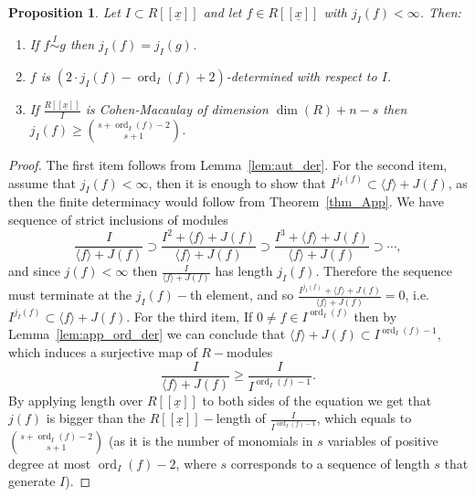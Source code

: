 \documentclass{article}
\newtheorem{proposition}[theorem]{Proposition}
\newtheorem{remark}[theorem]{Remark}
\DeclareMathOperator{\ord}{ord}
\newcommand{\equivd}{\overset{I}{\sim}}
\numberwithin{theorem}{section}
\begin{document}

\begin{proposition}\label{prop:jacobian_prop}
    Let $I \subset R[[\underline{x}]]$ and let $f \in R[[\underline{x}]]$ with $j_I(f)<\infty$. Then:
    \begin{enumerate}
        \item If $f \equivd g$ then $j_I(f)=j_I(g)$.
        \item $f$ is $(2 \cdot j_I(f) -\ord_I(f)+2)$-determined with respect to $I$. 
        \item If $\frac{R[[\underline{x}]]}{I}$ is Cohen-Macaulay of dimension $\dim(R) + n- s$ then  $j_I(f) \geq \binom{s+\ord_I(f)-2}{s+1}$.
    \end{enumerate}
\end{proposition}

\begin{proof}
    The first item follows from Lemma~\ref{lem:aut_der}. For the second item, assume that $j_I(f) < \infty$, then it is enough to show that $I^{j_I(f)} \subset \langle f \rangle + J(f)$, as then the finite determinacy would follow from Theorem~\ref{thm_App}. We have sequence of strict inclusions of modules
    \begin{equation*}
        \frac{I}{\langle f \rangle +J(f)} \supset \frac{I^2 + \langle f \rangle +J(f)}{\langle f \rangle +J(f)} \supset \frac{I^3  + \langle f \rangle +J(f)}{\langle f \rangle +J(f)} \supset \cdots, 
    \end{equation*}
    and since $j(f)<\infty$ then $\frac{I}{\langle f \rangle +J(f)}$ has length $j_I(f)$. Therefore the sequence must terminate at the $j_I(f)-$th element, and so $\frac{I^{j_I(f)} + \langle f \rangle +J(f)}{\langle f \rangle +J(f)}=0$, i.e. $I^{j_I(f)} \subset \langle f \rangle +J(f)$.
    For the third item, If $0 \neq f \in I^{\ord_I(f)}$ then by Lemma~\ref{lem:app_ord_der} we can conclude that $\langle f \rangle +J(f) \subset I^{\ord_I(f)-1}$, which induces a surjective map of $R-$modules
    \begin{equation*}
        \frac{I}{\langle f \rangle +J(f) } \geq \frac{I}{I^{\ord_I(f)-1}}.
    \end{equation*}
    By applying length over $R[[\underline{x}]]$ to both sides of the equation we get that $j(f)$ is bigger than the $R[[\underline{x}]]-$length of  $\frac{I}{I^{\ord_I(f)-1}}$, which equals to $\binom{s+\ord_I(f)-2}{s+1}$ (as it is the number of monomials in $s$ variables of positive degree at most $\ord_I(f)-2$, where $s$ corresponds to a sequence of length $s$ that generate $I$).
\end{proof}
\end{document}
